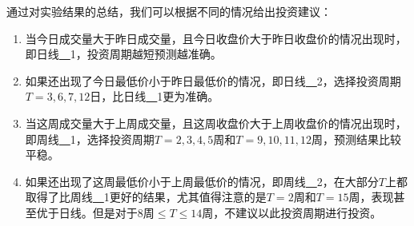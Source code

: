 通过对实验结果的总结，我们可以根据不同的情况给出投资建议：
\begin{enumerate}
    \item 当今日成交量大于昨日成交量，且今日收盘价大于昨日收盘价的情况出现时，即日线\underline{~~}1，投资周期越短预测越准确。
    \item 如果还出现了今日最低价小于昨日最低价的情况，即日线\underline{~~}2，选择投资周期$T=3,6,7,12\text{日}$，比日线\underline{~~}1更为准确。
    \item 当这周成交量大于上周成交量，且这周收盘价大于上周收盘价的情况出现时，即周线\underline{~~}1，选择投资周期$T=2,3,4,5\text{周}$和$T=9,10,11,12\text{周}$，预测结果比较平稳。
    \item 如果还出现了这周最低价小于上周最低价的情况，即周线\underline{~~}2，在大部分$T$上都取得了比周线\underline{~~}1更好的结果，尤其值得注意的是$T=2\text{周}$和$T=15\text{周}$，表现甚至优于日线。但是对于$8\text{周}\leq T\leq14\text{周}$，不建议以此投资周期进行投资。
\end{enumerate}